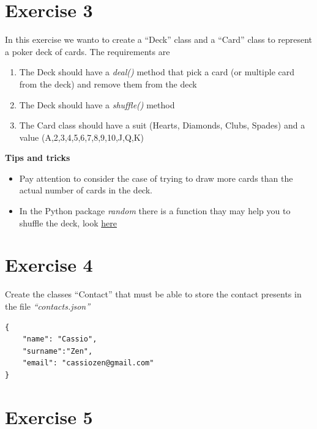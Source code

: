 \documentclass[11pt]{article}
\providecommand{\tightlist}{%
      \setlength{\itemsep}{0pt}\setlength{\parskip}{0pt}}
\begin{document}
    \hypertarget{exercise-3}{%
\section{Exercise 3}\label{exercise-3}}

In this exercise we wanto to create a ``Deck'' class and a ``Card''
class to represent a poker deck of cards. The requirements are

\begin{enumerate}
\def\labelenumi{\arabic{enumi}.}
\tightlist
\item
  The Deck should have a \emph{deal()} method that pick a card (or
  multiple card from the deck) and remove them from the deck
\item
  The Deck should have a \emph{shuffle()} method
\item
  The Card class should have a suit (Hearts, Diamonds, Clubs, Spades)
  and a value (A,2,3,4,5,6,7,8,9,10,J,Q,K)
\end{enumerate}

\textbf{Tips and tricks}

\begin{itemize}
\tightlist
\item
  Pay attention to consider the case of trying to draw more cards than
  the actual number of cards in the deck.
\item
  In the Python package \emph{random} there is a function thay may help
  you to shuffle the deck, look
  \href{https://docs.python.org/3/library/random.html}{here}
\end{itemize}

    \hypertarget{exercise-4}{%
\section{Exercise 4}\label{exercise-4}}

Create the classes ``Contact'' that must be able to store the contact
presents in the file \emph{``contacts.json''}

    \begin{verbatim}
{
    "name": "Cassio",
    "surname":"Zen",
    "email": "cassiozen@gmail.com"
}
\end{verbatim}

    \hypertarget{exercise-5}{%
\section{Exercise 5}\label{exercise-5}}
\end{document}
